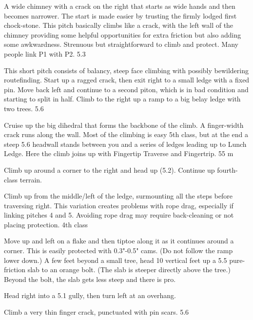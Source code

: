 \documentclass{tahquitz}
\begin{document}
A wide chimney with a crack on the right that
starts as wide hands and then becomes narrower.  The start is made
easier by trusting the firmly lodged first chock-stone.  This pitch
basically climbs like a crack, with the left wall of the chimney
providing some helpful opportunities for extra friction but also
adding some awkwardness.  Strenuous but straightforward to climb and
protect.
Many people link P1 with P2. 5.3

 This short pitch consists of balancy, steep face climbing with
possibly bewildering routefinding. Start up a ragged crack, then
exit right to a small ledge with a fixed pin.
Move back left and continue to a second piton, which is in bad condition
and starting to split in half. Climb to the right up a ramp to a big belay
ledge with two trees. 5.6

 Cruise up the big dihedral that forms the backbone of the climb. A
finger-width crack runs along the wall.
Most of the climbing is easy 5th class, but at the end a steep 5.6 headwall
stands between you and a series of ledges leading up to
Lunch Ledge. Here the climb joins up with Fingertip Traverse
and Fingertrip. 55 m


 Climb up around a corner to the right and head up (5.2).
Continue up fourth-class terrain.

 Climb up from the middle/left of the ledge, surmounting all the steps
before traversing right. This variation creates problems with rope drag, especially
if linking pitches 4 and 5. Avoiding rope drag may require back-cleaning or not
placing protection. 4th class

 Move up and left on a flake and then tiptoe along it as it
continues around a corner.  This is easily protected with 0.3"-0.5"
cams. (Do not follow the ramp lower down.)  A few feet beyond a small
tree, head 10 vertical feet up a 5.5 pure-friction slab to an orange bolt. (The slab
is steeper directly above the tree.) Beyond the bolt, the slab gets
less steep and there is pro. 

 Head right into a 5.1 gully, then turn left at an overhang.

 Climb a very thin finger crack, punctuated with pin scars. 5.6

\upfriction
\end{document}
